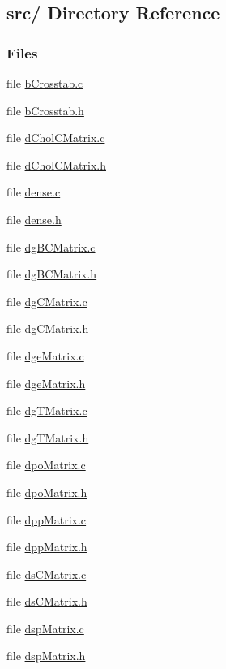 \hypertarget{dir_000000}{
\subsection{src/ Directory Reference}
\label{dir_000000}
}
\subsubsection*{Files}
\begin{CompactItemize}
\item 
file \hyperlink{bCrosstab_8c}{b\-Crosstab.c}
\item 
file \hyperlink{bCrosstab_8h}{b\-Crosstab.h}
\item 
file \hyperlink{dCholCMatrix_8c}{d\-Chol\-CMatrix.c}
\item 
file \hyperlink{dCholCMatrix_8h}{d\-Chol\-CMatrix.h}
\item 
file \hyperlink{dense_8c}{dense.c}
\item 
file \hyperlink{dense_8h}{dense.h}
\item 
file \hyperlink{dgBCMatrix_8c}{dg\-BCMatrix.c}
\item 
file \hyperlink{dgBCMatrix_8h}{dg\-BCMatrix.h}
\item 
file \hyperlink{dgCMatrix_8c}{dg\-CMatrix.c}
\item 
file \hyperlink{dgCMatrix_8h}{dg\-CMatrix.h}
\item 
file \hyperlink{dgeMatrix_8c}{dge\-Matrix.c}
\item 
file \hyperlink{dgeMatrix_8h}{dge\-Matrix.h}
\item 
file \hyperlink{dgTMatrix_8c}{dg\-TMatrix.c}
\item 
file \hyperlink{dgTMatrix_8h}{dg\-TMatrix.h}
\item 
file \hyperlink{dpoMatrix_8c}{dpo\-Matrix.c}
\item 
file \hyperlink{dpoMatrix_8h}{dpo\-Matrix.h}
\item 
file \hyperlink{dppMatrix_8c}{dpp\-Matrix.c}
\item 
file \hyperlink{dppMatrix_8h}{dpp\-Matrix.h}
\item 
file \hyperlink{dsCMatrix_8c}{ds\-CMatrix.c}
\item 
file \hyperlink{dsCMatrix_8h}{ds\-CMatrix.h}
\item 
file \hyperlink{dspMatrix_8c}{dsp\-Matrix.c}
\item 
file \hyperlink{dspMatrix_8h}{dsp\-Matrix.h}
\item 

\end{CompactItemize}
